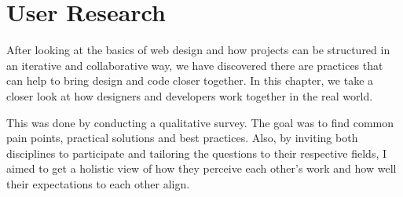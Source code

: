 \newpage
\section{User Research}
After looking at the basics of web design and how projects can be structured in an iterative and
collaborative way, we have discovered there are practices that can help to bring design and code
closer together. In this chapter, we take a closer look at how designers and developers work
together in the real world. 

This was done by conducting a qualitative survey. The goal was to find common pain points, practical
solutions and best practices. Also, by inviting both disciplines to participate and tailoring the
questions to their respective fields, I aimed to get a holistic view of how they perceive each
other's work and how well their expectations to each other align. 




